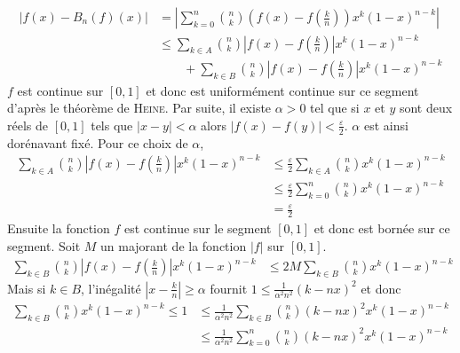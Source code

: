 \begin{enumerate}
        \[
            \begin{aligned}
                \lvert f(x) - B_n(f)(x)| &= \left\lvert \sum\limits_{k=0}^n\binom{n}{k}\left(f(x) - f\left(\frac{k}{n}\right)\right) x^k (1-x)^{n-k} \right\rvert\\
                &\leqslant \sum\limits_{k\in A}\binom{n}{k}\left\lvert f(x) - f\left(\frac{k}{n}\right)\right\rvert x^k (1-x)^{n-k}\\&\qquad + \sum\limits_{k\in B}\binom{n}{k}\left\lvert f(x) - f\left(\frac{k}{n}\right)\right\rvert x^k (1-x)^{n-k}
            \end{aligned}                    
        \]
        $f$ est continue sur $[0,1]$ et donc est uniformément continue sur ce segment d'après le théorème de \textsc{Heine}. Par suite, il existe $\alpha > 0$ tel que si $x$ et $y$ sont deux réels de $[0,1]$ tels que $\lvert x - y \rvert < \alpha$ alors $\lvert f(x) - f(y) \rvert < \frac{\varepsilon}{2}$. $\alpha$ est ainsi dorénavant fixé. Pour ce choix de $\alpha$,
        \[
            \begin{aligned}
                \sum\limits_{k\in A}\binom{n}{k}\left\lvert f(x) - f\left(\frac{k}{n}\right)\right\rvert x^k (1-x)^{n-k} &\leqslant \frac{\varepsilon}{2} \sum\limits_{k\in A}\binom{n}{k} x^k (1-x)^{n-k}\\
                &\leqslant \frac{\varepsilon}{2} \sum\limits_{k=0}^n\binom{n}{k} x^k (1-x)^{n-k}\\
                &=\frac{\varepsilon}{2}
            \end{aligned}
        \]
        Ensuite la fonction $f$ est continue sur le segment $[0,1]$ et donc est bornée sur ce segment. Soit $M$ un majorant de la fonction $\lvert f\rvert$ sur $[0,1]$.
        \[
            \begin{aligned}
                \sum\limits_{k\in B}\binom{n}{k}\left\lvert f(x) - f\left(\frac{k}{n}\right)\right\rvert x^k (1-x)^{n-k} &\leqslant 2M\sum\limits_{k\in B}\binom{n}{k} x^k (1-x)^{n-k}
            \end{aligned}
        \]
        Mais si $k\in B$, l'inégalité $\left\lvert x- \frac{k}{n} \right\rvert \geqslant \alpha$ fournit $1\leqslant \frac{1}{\alpha^2n^2} (k-nx)^2$ et donc
        \[
            \begin{aligned}
                \sum\limits_{k\in B}\binom{n}{k} x^k(1-x)^{n-k} \leqslant 1 &\leqslant \frac{1}{\alpha^2n^2}\sum\limits_{k\in B}\binom{n}{k} (k-nx)^2 x^k(1-x)^{n-k}\\
                &\leqslant \frac{1}{\alpha^2n^2} \sum\limits_{k=0}^n \binom{n}{k} (k-nx)^2 x^k (1-x)^{n-k}\\

\end{aligned}\]
\end{enumerate}
